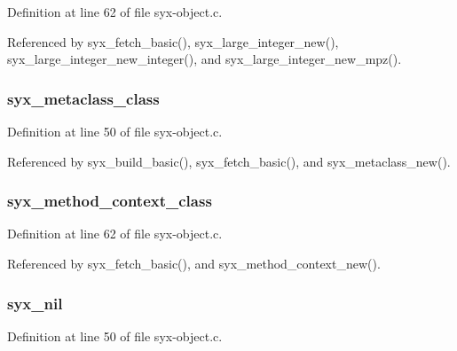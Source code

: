 Definition at line 62 of file syx-object.c.

Referenced by syx\_\-fetch\_\-basic(), syx\_\-large\_\-integer\_\-new(), syx\_\-large\_\-integer\_\-new\_\-integer(), and syx\_\-large\_\-integer\_\-new\_\-mpz().\hypertarget{syx-object_8c_0cf8d3871a460f97d82abf627a613fb0}{
\subsubsection{ {\bf syx\_\-metaclass\_\-class}}}
\label{syx-object_8c_0cf8d3871a460f97d82abf627a613fb0}




Definition at line 50 of file syx-object.c.

Referenced by syx\_\-build\_\-basic(), syx\_\-fetch\_\-basic(), and syx\_\-metaclass\_\-new().\hypertarget{syx-object_8c_e2242d95390ddfa0dadc10d7b41b65f9}{
\subsubsection{ {\bf syx\_\-method\_\-context\_\-class}}}
\label{syx-object_8c_e2242d95390ddfa0dadc10d7b41b65f9}




Definition at line 62 of file syx-object.c.

Referenced by syx\_\-fetch\_\-basic(), and syx\_\-method\_\-context\_\-new().\hypertarget{syx-object_8c_b1522ab23d05036a843da6f50860c45d}{
\subsubsection{ {\bf syx\_\-nil}}}
\label{syx-object_8c_b1522ab23d05036a843da6f50860c45d}




Definition at line 50 of file syx-object.c.

